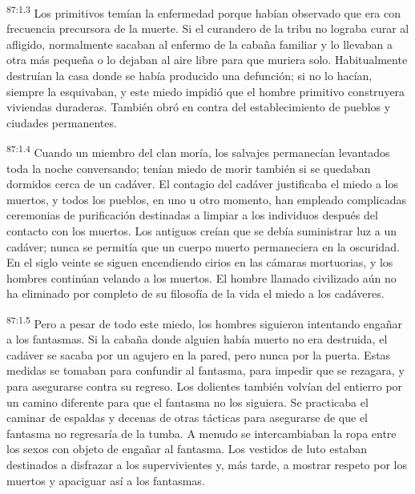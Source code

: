 \par
\textsuperscript{87:1.3} Los primitivos temían la enfermedad porque habían observado que era con frecuencia precursora de la muerte. Si el curandero de la tribu no lograba curar al afligido, normalmente sacaban al enfermo de la cabaña familiar y lo llevaban a otra más pequeña o lo dejaban al aire libre para que muriera solo. Habitualmente destruían la casa donde se había producido una defunción; si no lo hacían, siempre la esquivaban, y este miedo impidió que el hombre primitivo construyera viviendas duraderas. También obró en contra del establecimiento de pueblos y ciudades permanentes.

\par
\textsuperscript{87:1.4} Cuando un miembro del clan moría, los salvajes permanecían levantados toda la noche conversando; tenían miedo de morir también si se quedaban dormidos cerca de un cadáver. El contagio del cadáver justificaba el miedo a los muertos, y todos los pueblos, en uno u otro momento, han empleado complicadas ceremonias de purificación destinadas a limpiar a los individuos después del contacto con los muertos. Los antiguos creían que se debía suministrar luz a un cadáver; nunca se permitía que un cuerpo muerto permaneciera en la oscuridad. En el siglo veinte se siguen encendiendo cirios en las cámaras mortuorias, y los hombres continúan velando a los muertos. El hombre llamado civilizado aún no ha eliminado por completo de su filosofía de la vida el miedo a los cadáveres.

\par
\textsuperscript{87:1.5} Pero a pesar de todo este miedo, los hombres siguieron intentando engañar a los fantasmas. Si la cabaña donde alguien había muerto no era destruida, el cadáver se sacaba por un agujero en la pared, pero nunca por la puerta. Estas medidas se tomaban para confundir al fantasma, para impedir que se rezagara, y para asegurarse contra su regreso. Los dolientes también volvían del entierro por un camino diferente para que el fantasma no los siguiera. Se practicaba el caminar de espaldas y decenas de otras tácticas para asegurarse de que el fantasma no regresaría de la tumba. A menudo se intercambiaban la ropa entre los sexos con objeto de engañar al fantasma. Los vestidos de luto estaban destinados a disfrazar a los supervivientes y, más tarde, a mostrar respeto por los muertos y apaciguar así a los fantasmas.


